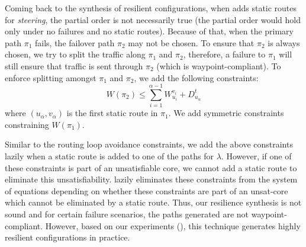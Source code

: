 

Coming back to the synthesis of resilient configurations,
when \name adds static routes for \emph{steering},  
the partial order  is not necessarily true 
(the partial order would hold only under no failures and 
no static routes). 
Because of that, when the primary path $\pi_1$ fails, the 
failover path $\pi_2$ may not be chosen. To ensure that 
$\pi_2$ is always chosen, we try to split the traffic
along $\pi_1$ and $\pi_2$, therefore, a failure to $\pi_1$
will still ensure that traffic is sent through $\pi_2$ 
(which is waypoint-compliant). To enforce splitting amongst
$\pi_1$ and $\pi_2$, we add the following constraints: 
\begin{equation}
	W(\pi_2) \leq \sum_{i=1}^{\alpha - 1} W_{u_i}^{v_i} + D_{u_\alpha}^t	
\end{equation}
where $(u_\alpha, v_\alpha)$ is the first static route in $\pi_1$.
We add symmetric constraints constraining $W(\pi_1)$. 

Similar to the routing loop avoidance constraints, we add the
above constraints lazily when a static route is added to one of the
paths for $\lambda$. However, if one of these constraints is part of 
an unsatisfiable core, we cannot add a static route to eliminate 
this unsatisfiability. \name lazily eliminates these constraints from the
system of equations depending on whether these constraints are part of 
an unsat-core which cannot be eliminated by a static route. Thus, 
our resilience synthesis is not sound and for certain failure scenarios, 
the paths generated are not waypoint-compliant. However, 
based on our experiments (), 
this technique generates highly resilient configurations 
in practice. 

